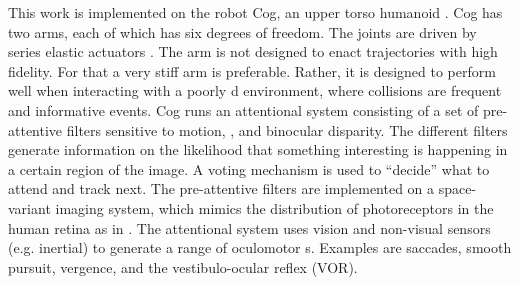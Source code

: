 This work is implemented on the robot Cog, an upper torso humanoid
\cite{brooks99cog}.  
Cog has two arms, each of which has six
degrees of freedom. %
The joints are driven by series elastic
actuators \cite{williamson99robot}.
The arm is not designed to enact trajectories with
high fidelity.  For that a very stiff arm is preferable.  Rather, it
is designed to perform well when interacting with a poorly
\ahhcharacterize{}d environment, where collisions are frequent and
informative events.
Cog runs an attentional system consisting of a set of pre-attentive
filters sensitive to motion, \ahhcolor{}, and binocular disparity. The
different filters generate information on the likelihood that
something interesting is happening in a certain region of the image. A
voting mechanism is used to ``decide'' what to attend and track
next. The pre-attentive filters are implemented on a space-variant
imaging system, which mimics the distribution
of photoreceptors in the human retina as in \cite{sandini-tagliasco-1980}.
 The attentional system uses vision and non-visual sensors
(e.g. inertial) to generate a range of oculomotor \ahhbehavior{}s. Examples
are saccades, smooth pursuit, vergence, and the vestibulo-ocular
reflex (VOR).






